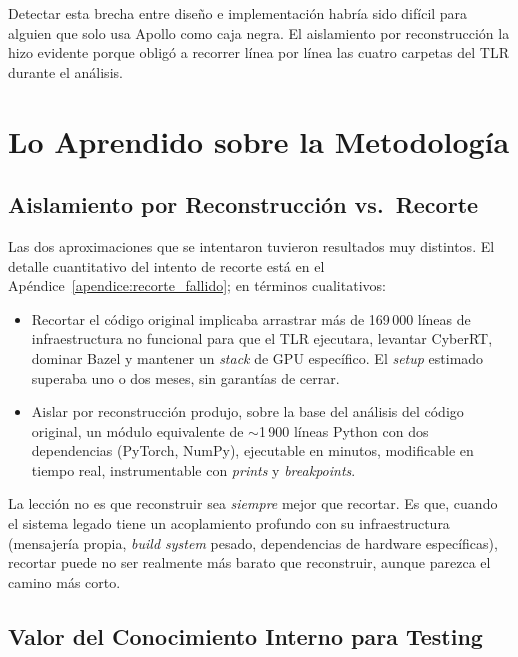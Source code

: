 Detectar esta brecha entre diseño e implementación habría sido difícil para alguien que solo usa Apollo como caja negra. El aislamiento por reconstrucción la hizo evidente porque obligó a recorrer línea por línea las cuatro carpetas del TLR durante el análisis.

\section{Lo Aprendido sobre la Metodología}

\subsection{Aislamiento por Reconstrucción vs.\ Recorte}

Las dos aproximaciones que se intentaron tuvieron resultados muy distintos. El detalle cuantitativo del intento de recorte está en el Apéndice~\ref{apendice:recorte_fallido}; en términos cualitativos:

\begin{itemize}
    \item Recortar el código original implicaba arrastrar más de 169\,000 líneas de infraestructura no funcional para que el TLR ejecutara, levantar CyberRT, dominar Bazel y mantener un \textit{stack} de GPU específico. El \textit{setup} estimado superaba uno o dos meses, sin garantías de cerrar.
    \item Aislar por reconstrucción produjo, sobre la base del análisis del código original, un módulo equivalente de $\sim$1\,900 líneas Python con dos dependencias (PyTorch, NumPy), ejecutable en minutos, modificable en tiempo real, instrumentable con \textit{prints} y \textit{breakpoints}.
\end{itemize}

La lección no es que reconstruir sea \textit{siempre} mejor que recortar. Es que, cuando el sistema legado tiene un acoplamiento profundo con su infraestructura (mensajería propia, \textit{build system} pesado, dependencias de hardware específicas), recortar puede no ser realmente más barato que reconstruir, aunque parezca el camino más corto.

\subsection{Valor del Conocimiento Interno para Testing}

